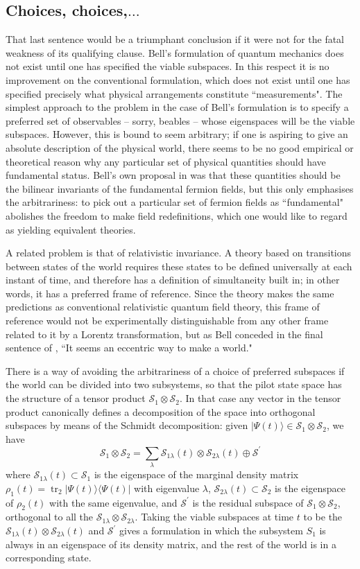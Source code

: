 \documentclass[12pt,a4paper,reqno]{article}
\renewcommand{\(}{\left(}
\renewcommand{\)}{\right)}
\renewcommand{\S}{\mathcal{S}}
\newcommand{\ox}{\otimes}
\newcommand{\<}{\langle}
\renewcommand{\>}{\rangle}
\newcommand{\tr}{\operatorname{tr}}
\theoremstyle{plain} %
\theoremstyle{definition}
\theoremstyle{remark}
\begin{document}
\subsection{Choices, choices,$\ldots$}

That last sentence would be a triumphant conclusion if it were not for
the fatal weakness of its qualifying clause. Bell's formulation of
quantum mechanics does not exist until one has specified the viable
subspaces. In this respect it is no improvement on the conventional
formulation, which does not exist until one has specified precisely what
physical arrangements constitute ``measurements". The simplest approach
to the problem in the case of Bell's formulation is to specify a
preferred set of observables -- sorry, beables -- whose eigenspaces will
be the viable subspaces. However, this is bound to seem arbitrary; if
one is aspiring to give an absolute description of the physical world, there
seems to be no good empirical or theoretical reason why any
particular set of physical quantities should have fundamental status.
Bell's own proposal in \cite{Bell:beables} was that these quantities
should be the bilinear invariants of the fundamental fermion fields, but
this only emphasises the arbitrariness: to pick out a particular set of
fermion fields as ``fundamental" abolishes the freedom to make field
redefinitions, which one would like to regard as yielding equivalent
theories. 

A related problem is that of relativistic invariance. A theory based on
transitions between states of the world requires these states to be
defined universally at each instant of time, and therefore has a
definition of simultaneity built in; in other words, it has a preferred 
frame of reference. Since the theory makes the same predictions as
conventional relativistic quantum field theory, this frame of reference
would not be experimentally distinguishable from any other frame related to it
by a Lorentz transformation, but as Bell conceded in the final sentence of
\cite{Bell:beables}, ``It seems an eccentric way to make a world."

There is a way of avoiding the arbitrariness of a choice of preferred
subspaces if the world can be divided into two subsystems, so that the
pilot state space has the structure of a tensor product $\S_1\ox\S_2$. 
In that case any vector in the tensor product canonically defines a
decomposition of the space into orthogonal subspaces by means of the
Schmidt decomposition: given $|\Psi(t)\>\in \S_1\ox\S_2$, we have
\[
\S_1\ox\S_2 = \sum_\lambda \S_{1\lambda}(t)\ox\S_{2\lambda}(t) \oplus
\S^\prime
\]
where $\S_{1\lambda}(t)\subset\S_1$ is the eigenspace of the marginal
density matrix $\rho_1(t)=\tr_2|\Psi(t)\>\<\Psi(t)|$ with eigenvalue
$\lambda$, $\S_{2\lambda}(t)\subset\S_2$ is the eigenspace of
$\rho_2(t)$ with the same eigenvalue, and $\S^\prime$ is the residual
subspace of $\S_1\ox\S_2$, orthogonal to all the
$\S_{1\lambda}\ox\S_{2\lambda}$. Taking the viable subspaces at time $t$ 
to be the $\S_{1\lambda}(t)\ox\S_{2\lambda}(t)$ and $\S^\prime$ gives a 
formulation in which the
subsystem $S_1$ is always in an eigenspace of its density matrix, and
the rest of the world is in a corresponding state.
\end{document}

